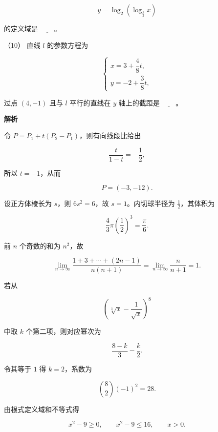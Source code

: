 \begin{answer}
\nopagebreak[4]
\[
y=\log_2\left(\log_{\frac12}x\right)
\]

的定义域是 $\underline{\hspace{2em}}$。

（10） 直线 $l$ 的参数方程为

\nopagebreak[4]
\[
\begin{cases}
x=3+\dfrac48t,\\
y=-2+\dfrac38t,
\end{cases}
\]

过点 $(4,-1)$ 且与 $l$ 平行的直线在 $y$ 轴上的截距是 $\underline{\hspace{2em}}$。

\textbf{解析}


令 $P=P_1+t(P_2-P_1)$，则有向线段比给出

\nopagebreak[4]
\[
\frac{t}{1-t}=-\frac12,
\]

所以 $t=-1$，从而

\nopagebreak[4]
\[
P=(-3,-12).
\]


设正方体棱长为 $s$，则 $6s^2=6$，故 $s=1$。内切球半径为 $\frac12$，其体积为

\nopagebreak[4]
\[
\frac43\pi\left(\frac12\right)^3=\frac\pi6.
\]


前 $n$ 个奇数的和为 $n^2$，故

\nopagebreak[4]
\[
\lim_{n\to\infty}
\frac{1+3+\cdots+(2n-1)}{n(n+1)}
=\lim_{n\to\infty}\frac n{n+1}=1.
\]


若从

\nopagebreak[4]
\[
\left(\sqrt[3]x-\frac1{\sqrt x}\right)^8
\]

中取 $k$ 个第二项，则对应幂次为

\nopagebreak[4]
\[
\frac{8-k}{3}-\frac k2.
\]

令其等于 $1$ 得 $k=2$，系数为

\nopagebreak[4]
\[
\binom82(-1)^2=28.
\]


由根式定义域和不等式得

\nopagebreak[4]
\[
x^2-9\ge0,\qquad x^2-9\le16,\qquad x>0.
\]


\end{answer}
